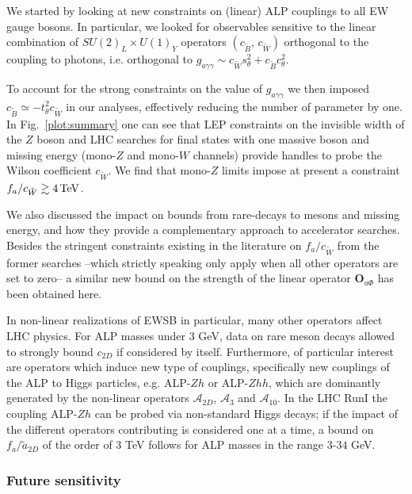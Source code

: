 \documentclass[11pt]{article}
\newcommand{\A}{\mathcal{A}}
\renewcommand{\O}{\mathbf{O}}
\newcommand{\Bt}{{\tilde{B}}}
\newcommand{\Wt}{{\tilde{W}}}
\renewcommand{\[}{\begin{equation}}
\renewcommand{\]}{\end{equation}}
\begin{document}
\vspace{-2mm}

We started by looking at new constraints on (linear) ALP couplings to all EW gauge bosons.
 In particular, we looked for observables sensitive to the linear combination of $SU(2)_L\times U(1)_Y$ operators 
 $(c_\Bt, \, c_\Wt)$  orthogonal to the coupling to photons, i.e. orthogonal to $g_{a\gamma\gamma} \sim c_\Wt s_\theta^2 + c_\Bt c_\theta^2$. 

To account for the strong constraints on the value of $g_{a\gamma\gamma}$ we then imposed $ c_\Bt \simeq -  t_\theta^2 c_\Wt$ in our analyses, 
effectively reducing the number of parameter by one.  In Fig.~\ref{plot:summary} one can see that LEP constraints on the invisible width of 
the $Z$ boson and LHC searches for final states with one massive boson and missing energy (mono-$Z$ and mono-$W$ channels) provide handles to probe 
the Wilson coefficient $c_\Wt$. We find that mono-$Z$ limits impose at present a constraint $f_a/c_{\tilde W} \gtrsim \unit[4]{TeV} $.  

We also discussed the impact on bounds from rare-decays to mesons and missing energy, and how they provide a complementary approach to accelerator searches.
Besides the stringent constraints existing in the literature on $f_a/c_{\tilde W}$ from the former searches --which strictly speaking only apply when all other operators are set to zero-- a similar new bound on the strength of the linear operator $\O_{a\Phi}$  has been obtained here. 


In non-linear realizations of EWSB in particular, many other operators affect LHC physics.  For ALP masses under $3$ GeV, data on rare meson decays allowed to strongly bound $c_{2D}$ if considered by itself.  Furthermore, of particular interest are operators which induce new type of couplings, 
specifically new couplings of the ALP to Higgs particles, e.g. ALP-$Zh$ or ALP-$Zhh$, which are dominantly generated by the non-linear 
operators $\A_{2D}$, $\A_3$ and $\A_{10}$. In the LHC RunI the coupling ALP-$Zh$ can be probed via  non-standard Higgs decays; if the impact of the different operators contributing is considered one at a time, a bound on $f_a/\tilde a_{2D}$ of the order of 3 TeV follows for ALP masses in the range $3$-$34$ GeV.

\vspace{-2mm}

\subsubsection*{Future sensitivity}
\end{document}
